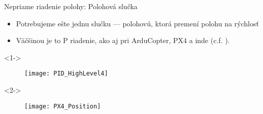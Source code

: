   
   \begin{frame}[t]{Nepriame riadenie polohy: Polohová slučka}
\begin{itemize}
  \item<1-> Potrebujeme ešte jednu slučku --- polohovú, ktorá premení polohu na rýchlosť

  \item<2-> Väčšinou je to P riadenie, ako aj pri ArduCopter, PX4 a inde (c.f. \cite{Saha2020}).
\end{itemize}

  \begin{onlyenv}<1->
  \begin{figure}
\centering
  \texttt{[image: PID\_HighLevel4]}\\
\end{figure}
\end{onlyenv}


  \begin{onlyenv}<2->
  \begin{figure}
\centering
  \texttt{[image: PX4\_Position]}\\
\end{figure}
\end{onlyenv}
  \end{frame}
  
